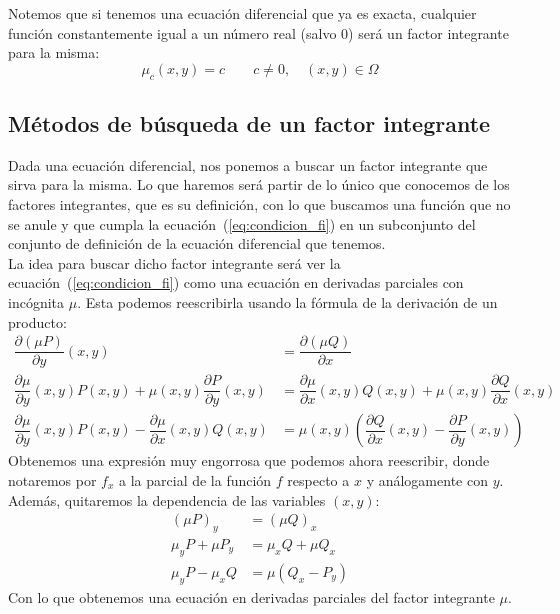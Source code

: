 \begin{observacion}
    Notemos que si tenemos una ecuación diferencial que ya es exacta, cualquier función constantemente igual a un número real (salvo 0) será un factor integrante para la misma:
    \begin{equation*}
        \mu_c(x,y) = c \qquad c\neq 0, \quad (x,y)\in \Omega
    \end{equation*}
\end{observacion}

\subsection{Métodos de búsqueda de un factor integrante}
Dada una ecuación diferencial, nos ponemos a buscar un factor integrante que sirva para la misma. Lo que haremos será partir de lo único que conocemos de los factores integrantes, que es su definición, con lo que buscamos una función que no se anule y que cumpla la ecuación~(\ref{eq:condicion_fi}) en un subconjunto del conjunto de definición de la ecuación diferencial que tenemos.\\

La idea para buscar dicho factor integrante será ver la ecuación~(\ref{eq:condicion_fi}) como una ecuación en derivadas parciales con incógnita $\mu$. Esta podemos reescribirla usando la fórmula de la derivación de un producto:
\begin{align*}
    \dfrac{\partial (\mu P)}{\partial y}(x,y) &= \dfrac{\partial (\mu Q)}{\partial x} \\
    \dfrac{\partial \mu}{\partial y}(x,y)P(x,y) + \mu(x,y)\dfrac{\partial P}{\partial y}(x,y) &= \dfrac{\partial \mu}{\partial x}(x,y)Q(x,y) + \mu(x,y) \dfrac{\partial Q}{\partial x}(x,y) \\
    \dfrac{\partial \mu}{\partial y}(x,y)P(x,y) - \dfrac{\partial \mu}{\partial x}(x,y)Q(x,y) &= \mu(x,y)\left(\dfrac{\partial Q}{\partial x}(x,y)-\dfrac{\partial P}{\partial y}(x,y)\right)
\end{align*}
Obtenemos una expresión muy engorrosa que podemos ahora reescribir, donde notaremos por $f_x$ a la parcial de la función $f$ respecto a $x$ y análogamente con $y$. Además, quitaremos la dependencia de las variables $(x,y)$:
\begin{align*}
    (\mu P)_y &= (\mu Q)_x \\
    \mu_y P + \mu P_y &= \mu_x Q + \mu Q_x \\
    \mu_y P - \mu_x Q &= \mu (Q_x - P_y)
\end{align*}
Con lo que obtenemos una ecuación en derivadas parciales del factor integrante $\mu$.\\


